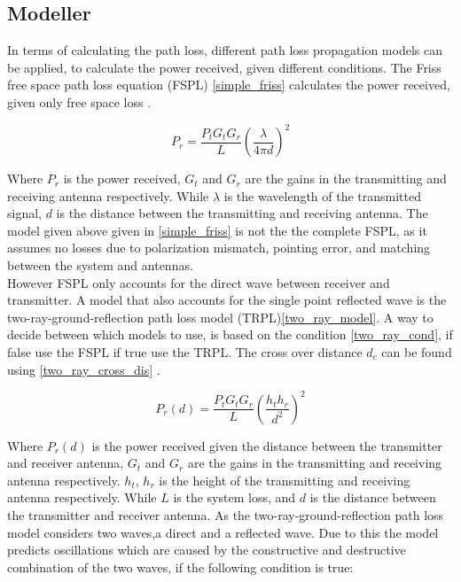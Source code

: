 \subsection{Modeller}

In terms of calculating the path loss, different path loss propagation models can be applied, to calculate the power received, given different conditions. The Friss free space path loss equation (FSPL) \eqref{simple_friss} calculates the power received, given only free space loss \cite{?}.

\begin{equation}
P_r = \frac{P_t G_t G_r}{L} \left(\frac{\lambda}{4 \pi d}\right)^2
\label{simple_friss}
\end{equation}

Where $P_{r}$ is the power received, $G_t$ and $G_r$ are the gains in the transmitting and receiving antenna respectively. While $\lambda$ is the wavelength of the transmitted signal, $d$ is the distance between the transmitting and receiving antenna. The model given above given in \eqref{simple_friss} is not the the complete FSPL, as it assumes no losses due to polarization mismatch, pointing error, and matching between the system and antennas\cite{?}. \\

However FSPL only accounts for the direct wave between receiver and transmitter. A model that also accounts for the single point reflected wave is the two-ray-ground-reflection path loss model (TRPL)\eqref{two_ray_model}. A way to decide between which models to use, is based on the condition \eqref{two_ray_cond}, if false use the FSPL if true use the TRPL. The cross over distance $d_c$ can be found using \eqref{two_ray_cross_dis} \cite{web}. 


\begin{equation}
P_r(d) = \frac{P_t G_t G_r }{L}\left(\frac{h_t h_r}{d^2}\right)^2
\label{two_ray_model}
\end{equation}

Where $P_r(d)$ is the power received given the distance between the transmitter and receiver antenna, $G_t$ and $G_r$ are the gains in the transmitting and receiving antenna respectively. $h_t$, $h_r$ is the height of the transmitting and receiving antenna respectively.  While $L$ is the system loss, and $d$ is the distance between the transmitter and receiver antenna. As the two-ray-ground-reflection path loss model considers two waves,a direct and a reflected wave. Due to this the model predicts  oscillations which are caused by the constructive and destructive combination of the two waves, if the following condition is true:


